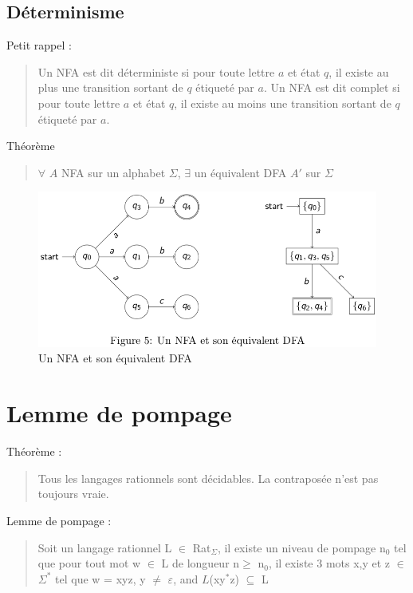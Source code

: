 \documentclass{article}
\begin{document}
\subsection{Déterminisme}
Petit rappel :
\begin{quote}
    Un NFA est dit déterministe si pour toute lettre $a$ et état $q$, il existe au plus une transition sortant de $q$ étiqueté par $a$.\newline
    Un NFA est dit complet si pour toute lettre $a$ et état $q$, il existe au moins une transition sortant de $q$ étiqueté par $a$.\newline
\end{quote}

Théorème
\begin{quote}
    $\forall$ $A$ NFA sur un alphabet $\Sigma$, $\exists$ un équivalent DFA $A'$ sur $\Sigma$ 
\end{quote}

\begin{figure}
    \centering
    \includegraphics[scale=0.3]{Image14.png}
    \caption{Un NFA et son équivalent DFA}
\end{figure}
\newpage
\section{Lemme de pompage}
Théorème :
\begin{quote}
    Tous les langages rationnels sont décidables. La contraposée n'est pas toujours vraie.
\end{quote}

Lemme de pompage :
\begin{quote}
    Soit un langage rationnel L $\in$ Rat$_{\Sigma}$, il existe un niveau de pompage n$_{0}$ tel que pour tout mot w $\in$ L de longueur n$\geq$ n$_{0}$, il existe 3 mots x,y et z $\in$ $\Sigma^{*}$ tel que w = xyz, y $\neq$ $\varepsilon$, and $L$(xy$^{*}$z) $\subseteq$ L
\end{quote}
\end{document}
